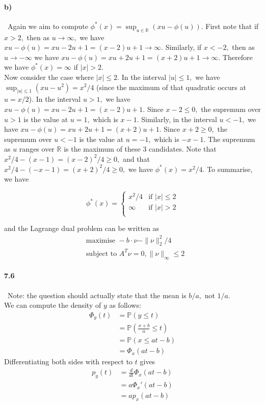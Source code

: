 \documentclass[a4paper,12pt]{article}
\begin{document}
\paragraph{b)}
\
Again we aim to compute $\phi^*(x) = \sup_{u\in\mathbb{R}}( xu - \phi(u)).$ First note that if $x>2,$ then as $u\to\infty,$ we have $xu - \phi(u)  = xu-2u+1 = (x-2)u+1 \to \infty.$ Similarly, if $x<-2,$ then as $u\to-\infty$ we have $xu - \phi(u) = xu + 2u +1 = (x+2)u+1 \to \infty.$ Therefore we have $\phi^*(x) = \infty$ if $|x|>2.$ \\
\newline
Now consider the case where $|x| \leq 2.$ In the interval $|u|\leq 1,$ we have $\sup_{|u|\leq 1} (xu - u^2) = x^2/4$ (since the maximum of that quadratic occurs at $u = x/2$). In the interval $u >1,$ we have $xu - \phi(u) = xu - 2u+1 = (x-2)u+1.$ Since $x-2\leq 0,$ the supremum over $u>1$ is the value at $u=1,$ which is $x-1.$ Similarly, in the interval $u< -1,$ we have $xu - \phi(u) = xu+2u+1 = (x+2)u+1.$ Since $x+2 \geq 0,$ the supremum over $u<-1$ is the value at $u=-1,$ which is $-x-1.$ The supremum as $u$ ranges over $\mathbb{R}$ is the maximum of these 3 candidates. Note that $x^2/4 - (x-1) = (x-2)^2/4 \geq 0,$ and that $x^2/4 - (-x-1) = (x+2)^2/4 \geq 0,$ we have $\phi^*(x) = x^2/4.$ To summarise, we have   

\[
  \phi^*(x) =
  \begin{cases}
                                   x^2/4 & \text{if }|x|\leq 2  \\
                                   \infty & \text{if } |x|>2 \\
  \end{cases}
\]

and the Lagrange dual problem can be written as 
\begin{align*}
 &\text{maximise } -b\cdot \nu -\|\nu\|^2_2/4 \\
 &\text{subject to } A^T\nu = 0, \|\nu\|_{\infty} \leq 2
\end{align*}


\paragraph{7.6}
\
Note: the question should actually state that the mean is $b/a,$ not $1/a.$ \\
\newline
We can compute the density of $y$ as follows:
\begin{align*}
 \Phi_y(t) &= \mathbb{P}(y \leq t) \\
           &= \mathbb{P}\left( \frac{x+b}{a} \leq t \right) \\
           &= \mathbb{P}(x \leq at -b) \\
           &= \Phi_x(at-b)
\end{align*}
Differentiating both sides with respect to $t$ gives 
\begin{align*}
 p_y(t) &= \frac{d}{dt} \Phi_x(at-b) \\
        &= a \Phi_x'(at-b) \\
        &= a p_x(at-b)
\end{align*}
\end{document}
